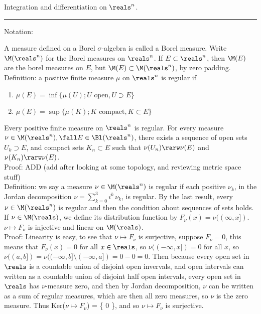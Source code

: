 
\break

\begin{flushleft}
Integration and differentiation on $\reals^n$.
\end{flushleft}

\begin{flushleft}
\addvspace{5pt} \hrule
\end{flushleft}	


Notation:

A measure defined on a Borel $\sigma$-algebra is called a Borel measure. Write $\M(\reals^n)$ for the Borel measures on $\reals^n$. If $E \subset \reals^n$, then $\M(E)$ are the borel measures on $E$, but $\M(E) \subset \M(\reals^n)$, by zero padding. \\

Definition: a positive finite measure $\mu$ on $\reals^n$ is regular if

\begin{enumerate}
\item
$\mu(E) = \inf \{ \mu(U) ; U \textrm{ open}, U \supset E \}$
\item
$\mu(E) = \sup \{ \mu(K) ; K \textrm{ compact}, K \subset E \}$
\end{enumerate}

Every positive finite measure on $\reals^n$ is regular. For every measure $\nu \in \M(\reals^n), \fall E \in \Bl(\reals^n)$, there exists a sequence of open sets $U_k \supset E$, and compact sets $K_n \subset E$ such that $\nu(U_n) \rarw \nu(E)$ and $\nu(K_n) \rarw \nu(E)$. \\

\noindent
Proof: ADD (add after looking at some topology, and reviewing metric space stuff)  \\

Definition: we say a measure $\nu \in \M(\reals^n)$ is regular if each positive $\nu_k$, in the Jordan decomposition $\nu = \sum_{k=0}^3 i^k \, \nu_k$, is regular. By the last result, every $\nu \in \M(\reals^n)$ is regular and then the condition about sequences of sets holds. \\

If $\nu \in \M(\reals)$, we define its distribution function by $F_\nu (x) = \nu((\infty,x])$. $\nu \mapsto F_\nu$ is injective and linear on $\M(\reals)$. \\

\noindent
Proof: Linearity is easy, to see that $\nu \mapsto F_\nu$ is surjective, suppose $F_\nu = 0$, this means that $F_\nu(x) = 0$ for all $x \in \reals$, so $\nu((-\infty, x]) = 0$ for all $x$, so $\nu((a,b]) = \nu((-\infty,b] \setminus (-\infty,a]) = 0 - 0 = 0$. Then because every open set in $\reals$ is a countable union of disjoint open invervals, and open intervals can written as a countable union of disjoint half open intervals, every open set in $\reals$ has $\nu$-measure zero, and then by Jordan decomposition, $\nu$ can be written as a sum of regular measures, which are then all zero measures, so $\nu$ is the zero measure. Thus Ker($\nu \mapsto F_\nu$) = \{ 0 \}, and so $\nu \mapsto F_\nu$ is surjective. \\


